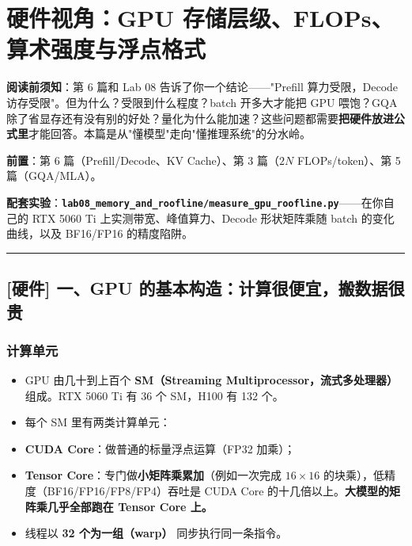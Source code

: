 \chapter{硬件视角：GPU 存储层级、FLOPs、算术强度与浮点格式}

\begin{mathBox}[核心数学定理推导]
\textbf{阅读前须知}：第 6 篇和 Lab 08 告诉了你一个结论——"Prefill 算力受限，Decode 访存受限"。但为什么？受限到什么程度？batch 开多大才能把 GPU 喂饱？GQA 除了省显存还有没有别的好处？量化为什么能加速？这些问题都需要\textbf{把硬件放进公式里}才能回答。本篇是从"懂模型"走向"懂推理系统"的分水岭。

\textbf{前置}：第 6 篇（Prefill/Decode、KV Cache）、第 3 篇（$2N$ FLOPs/token）、第 5 篇（GQA/MLA）。

\textbf{配套实验}：\textbf{\texttt{lab08\_memory\_and\_roofline/measure\_gpu\_roofline.py}}——在你自己的 RTX 5060 Ti 上实测带宽、峰值算力、Decode 形状矩阵乘随 batch 的变化曲线，以及 BF16/FP16 的精度陷阱。
\end{mathBox}

\vspace{0.8em}\hrule\vspace{0.8em}

\section{[硬件] 一、GPU 的基本构造：计算很便宜，搬数据很贵}

\subsection{计算单元}

\begin{itemize}
  \item GPU 由几十到上百个 \textbf{SM（Streaming Multiprocessor，流式多处理器）} 组成。RTX 5060 Ti 有 36 个 SM，H100 有 132 个。
  \item 每个 SM 里有两类计算单元：
  \item \textbf{CUDA Core}：做普通的标量浮点运算（FP32 加乘）；
  \item \textbf{Tensor Core}：专门做\textbf{小矩阵乘累加}（例如一次完成 $16 \times 16$ 的块乘），低精度（BF16/FP16/FP8/FP4）吞吐是 CUDA Core 的十几倍以上。\textbf{大模型的矩阵乘几乎全部跑在 Tensor Core 上。}
  \item 线程以 \textbf{32 个为一组（warp）} 同步执行同一条指令。
\end{itemize}

